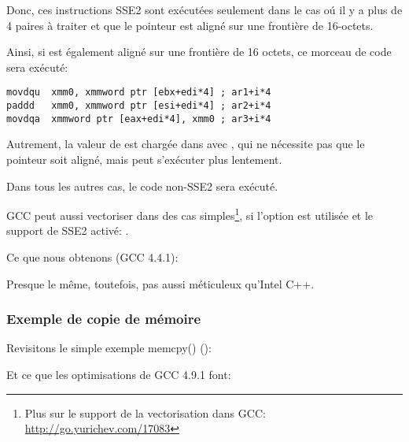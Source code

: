 Donc, ces instructions SSE2 sont exécutées seulement dans le cas oú il y a plus
de 4 paires à traiter et que le pointeur  est aligné sur une frontière de
16-octets.

Ainsi, si  est également aligné sur une frontière de 16 octets, ce morceau
de code sera exécuté:

\begin{lstlisting}[style=customasmx86]
movdqu  xmm0, xmmword ptr [ebx+edi*4] ; ar1+i*4
paddd   xmm0, xmmword ptr [esi+edi*4] ; ar2+i*4
movdqa  xmmword ptr [eax+edi*4], xmm0 ; ar3+i*4
\end{lstlisting}

Autrement, la valeur de  est chargée dans  avec \MOVDQU, qui ne nécessite
pas que le pointeur soit aligné, mais peut s'exécuter plus lentement.



Dans tous les autres cas, le code non-SSE2 sera exécuté.


\newcommand{\URLGCCVEC}{\url{http://go.yurichev.com/17083}}

GCC peut aussi vectoriser dans des cas simples\footnote{Plus sur le support de la
vectorisation dans GCC: \URLGCCVEC}, si l'option \Othree est utilisée et le support
de SSE2 activé: .

Ce que nous obtenons (GCC 4.4.1):



Presque le même, toutefois, pas aussi méticuleux qu'Intel C++.

\subsubsection{Exemple de copie de mémoire}
\label{vec_memcpy}

Revisitons le simple exemple memcpy()
():



Et ce que les optimisations de GCC 4.9.1 font:


